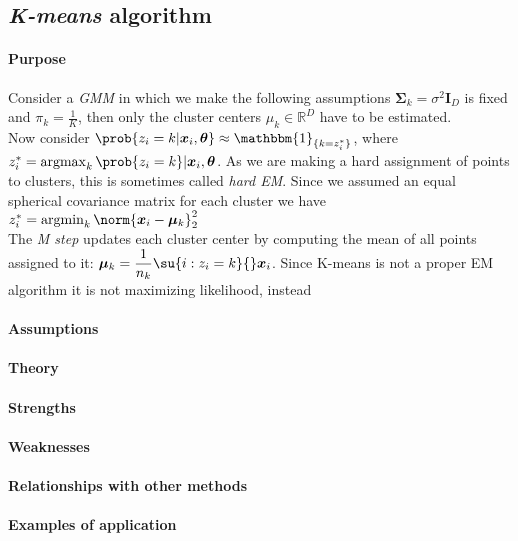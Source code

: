 \subsection{\emph{K-means} algorithm}
\paragraph{Purpose}
Consider a \emph{GMM} in which  we make the following assumptions $\bm{\Sigma}_{k}=
\sigma^{2}\bm{I}_{D}$ is fixed and $\pi_{k} = \frac{1}{K}$, then only the cluster 
centers $\mu_{k}\in\mathbb{R}^{D}$ have to be estimated.\\
Now consider $\prob{z_{i} = k|\bm{x}_{i},\bm{\theta}} \approx \mathbbm{1}_{\{k=z_{i}^{
*}\}}$, where $z_{i}^{*} = \argmax_{k}\prob{z_{i} = k}|\bm{x}_{i},\bm{\theta}$.
As we are making a hard assignment of points to clusters, this is sometimes called 
\emph{hard EM}. Since we assumed an equal spherical covariance matrix for each cluster 
we have $z_{i}^{*} = \argmin_{k}\norm{\bm{x}_{i} -\bm{\mu}_{k}}_{2}^{2}$\\
The \emph{M step} updates each cluster center by computing the mean of all points 
assigned to it:
$\bm{\mu}_{k} = \dfrac{1}{n_{k}}\su{i:z_{i}=k}{}\bm{x}_{i}$.
Since K-means is not a proper EM algorithm it is not maximizing likelihood, instead 
 

\paragraph{Assumptions}
\paragraph{Theory}
\paragraph{Strengths}
\paragraph{Weaknesses}
\paragraph{Relationships with other methods}
\paragraph{Examples of application}


